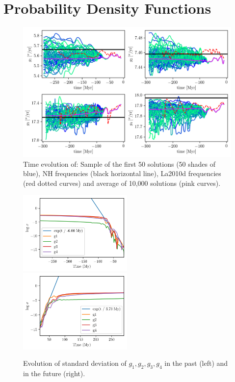 \documentclass[12pt]{article}
\begin{document}
	\section{Probability Density Functions} \label{sec:den}
	\begin{figure}[t]
		\centering
		\includegraphics[width=1.0\textwidth,center]{figures/PDF_sample}%
		\caption{Time evolution of: Sample of the first 50 solutions (50 shades of blue), NH frequencies (black horizontal line), La2010d frequencies (red dotted curves) and average of 10,000 solutions (pink curves).}
		\label{fig:sample}
	\end{figure}
	
	\begin{figure} 
		\centering
		\includegraphics[width=0.5\textwidth]{figures/log_sigma_g2.png}%
		\includegraphics[width=0.5\textwidth]{figures/log_sigma_g_+.png}%
		\caption{Evolution of standard deviation of $g_1, g_2, g_3, g_4$ in the past (left) and in the future (right).}
		\label{fig:log_variannce}
	\end{figure}
	
\end{document}
